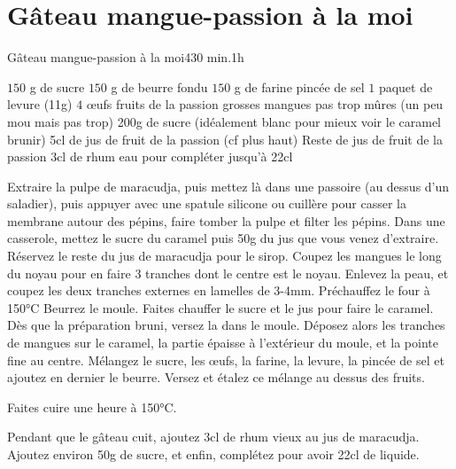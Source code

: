 {\section{Gâteau mangue-passion à la moi}
\begin{recette}{Gâteau mangue-passion à la moi}{4}{30 min.}{1h}
\begin{ingredients}
\ingredient[gâteau]
\ingredient $150$ g de sucre
\ingredient $150$ g de beurre fondu
\ingredient $150$ g de farine
 pincée de sel
\ingredient $1$ paquet de levure (11g)
\ingredient $4$ œufs
 fruits de la passion
 grosses mangues pas trop mûres (un peu mou mais pas trop)
\ingredient[caramel]
\ingredient 200g de sucre (idéalement blanc pour mieux voir le caramel brunir)
\ingredient 5cl de jus de fruit de la passion (cf plus haut)
\ingredient Reste de jus de fruit de la passion
\ingredient 3cl de rhum
\ingredient eau pour compléter jusqu'à 22cl
\end{ingredients}

\begin{preparation}
\etape Extraire la pulpe de maracudja, puis mettez là dans une passoire (au dessus d'un saladier), puis appuyer avec une spatule silicone ou cuillère pour casser la membrane autour des pépins, faire tomber la pulpe et filter les pépins. 
\etape Dans une casserole, mettez le sucre du caramel puis 50g du jus que vous venez d'extraire. Réservez le reste du jus de maracudja pour le sirop. 
\etape Coupez les mangues le long du noyau pour en faire 3 tranches dont le centre est le noyau. Enlevez la peau, et coupez les deux tranches externes en lamelles de 3-4mm.
\etape Préchauffez le four à 150°C
\etape Beurrez le moule. 
\etape Faites chauffer le sucre et le jus pour faire le caramel. Dès que la préparation bruni, versez la dans le moule. 
\etape Déposez alors les tranches de mangues sur le caramel, la partie épaisse à l'extérieur du moule, et la pointe fine au centre. 
\etape Mélangez le sucre, les œufs, la farine, la levure, la pincée de sel et ajoutez en dernier le beurre.
\etape Versez et étalez ce mélange au dessus des fruits.
\end{preparation}

\begin{cuisson}
Faites cuire une heure à 150°C.

Pendant que le gâteau cuit, ajoutez 3cl de rhum vieux au jus de maracudja. Ajoutez environ 50g de sucre, et enfin, complétez pour avoir 22cl de liquide. 


\end{cuisson}
\end{recette}}
